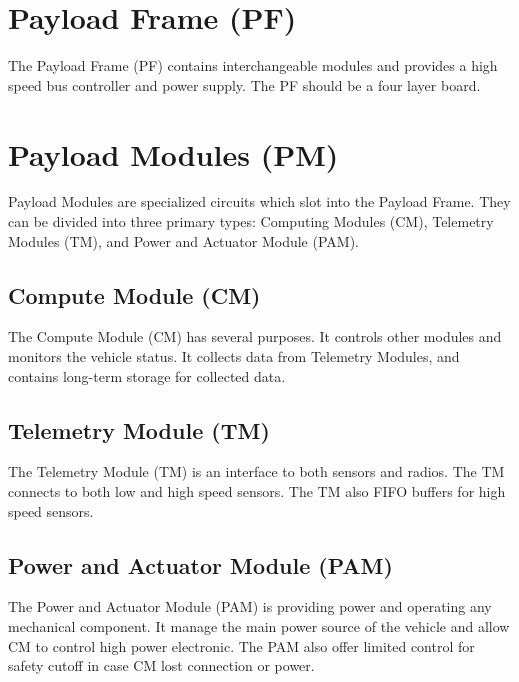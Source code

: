 \documentclass[12pt,article]{memoir}
\begin{document}
\section{Payload Frame (PF)}
The Payload Frame (PF) contains interchangeable modules and provides a high speed bus controller and power supply. The PF should be a four layer board.
\section{Payload Modules (PM)}
Payload Modules are specialized circuits which slot into the Payload Frame. They can be divided into three primary types: Computing Modules (CM), Telemetry Modules (TM), and Power and Actuator Module (PAM).
\subsection{Compute Module (CM)}
The Compute Module (CM) has several purposes. It controls other modules and monitors the vehicle status. It collects data from Telemetry Modules, and contains long-term storage for collected data. 
\subsection{Telemetry Module (TM)}
The Telemetry Module (TM) is an interface to both sensors and radios. The TM connects to both low and high speed sensors. The TM also FIFO buffers for high speed sensors.
\subsection{Power and Actuator Module (PAM)}%
The Power and Actuator Module (PAM) is providing power and operating any mechanical component. It manage the main power source of the vehicle and allow CM to control high power electronic. The PAM also offer limited control for safety cutoff in case CM lost connection or power.
\end{document}

